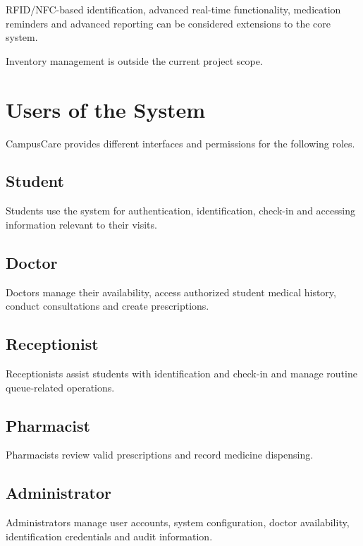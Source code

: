 \documentclass{tietreport}
\begin{document}
RFID/NFC-based identification, advanced real-time functionality,
medication reminders and advanced reporting can be considered
extensions to the core system.

Inventory management is outside the current project scope.

\section{Users of the System}

CampusCare provides different interfaces and permissions for the
following roles.

\subsection{Student}

Students use the system for authentication, identification,
check-in and accessing information relevant to their visits.

\subsection{Doctor}

Doctors manage their availability, access authorized student medical
history, conduct consultations and create prescriptions.

\subsection{Receptionist}

Receptionists assist students with identification and check-in and
manage routine queue-related operations.

\subsection{Pharmacist}

Pharmacists review valid prescriptions and record medicine dispensing.

\subsection{Administrator}

Administrators manage user accounts, system configuration, doctor
availability, identification credentials and audit information.


\end{document}
